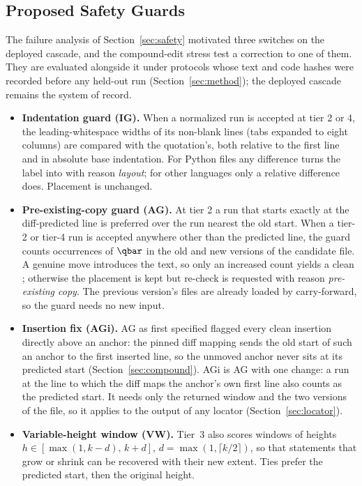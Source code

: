 \subsection{Proposed Safety Guards}\label{sec:guards}
The failure analysis of Section~\ref{sec:safety} motivated three switches on the deployed cascade, and the compound-edit stress test a correction to one of them. They are evaluated alongside it under protocols whose text and code hashes were recorded before any held-out run (Section~\ref{sec:method}); the deployed cascade remains the system of record.
\begin{itemize}
\item \textbf{Indentation guard (IG).} When a normalized run is accepted at tier 2 or 4, the leading-whitespace widths of its non-blank lines (tabs expanded to eight columns) are compared with the quotation's, both relative to the first line and in absolute base indentation. For Python files any difference turns the label into  with reason \emph{layout}; for other languages only a relative difference does. Placement is unchanged.
\item \textbf{Pre-existing-copy guard (AG).} At tier 2 a run that starts exactly at the diff-predicted line is preferred over the run nearest the old start. When a tier-2 or tier-4 run is accepted anywhere other than the predicted line, the guard counts occurrences of $\qbar$ in the old and new versions of the candidate file. A genuine move introduces the text, so only an increased count yields a clean ; otherwise the placement is kept but re-check is requested with reason \emph{pre-existing copy}. The previous version's files are already loaded by carry-forward, so the guard needs no new input.
\item \textbf{Insertion fix (AGi).} AG as first specified flagged every clean insertion directly above an anchor: the pinned diff mapping sends the old start of such an anchor to the first inserted line, so the unmoved anchor never sits at its predicted start (Section~\ref{sec:compound}). AGi is AG with one change: a run at the line to which the diff maps the anchor's own first line also counts as the predicted start. It needs only the returned window and the two versions of the file, so it applies to the output of any locator (Section~\ref{sec:locator}).
\item \textbf{Variable-height window (VW).} Tier~3 also scores windows of heights $h\in[\max(1,k-d),\,k+d]$, $d=\max(1,\lceil k/2\rceil)$, so that statements that grow or shrink can be recovered with their new extent. Ties prefer the predicted start, then the original height.
\end{itemize}
